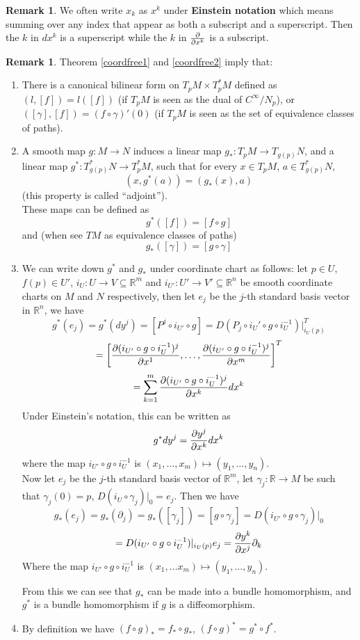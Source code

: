 \documentclass{article}
\theoremstyle{definition}
\newtheorem{rmk}[thm]{Remark}
\begin{document}
\begin{rmk}
    We often write $x_k$ as $x^k$ under {\bf Einstein notation} which means summing over any index that appear as both a subscript and a superscript. Then the $k$ in $dx^k$ is a superscript while the $k$ in $\partial\over \partial x^k$ is a subscript. 
\end{rmk}

\begin{rmk}
Theorem \ref{coordfree1} and \ref{coordfree2} imply that:

\begin{enumerate}
\item There is a canonical bilinear form on $T_pM\times T^*_pM$ defined as $(l, [f])=l([f])$ (if $T_pM$ is seen as the dual of $C^\infty/N_p$), or $([\gamma], [f])=(f\circ \gamma)'(0)$ (if $T_pM$ is seen as the set of equivalence classes of paths).
\item A smooth map $g: M\rightarrow N$ induces a linear map $g_*: T_pM\rightarrow T_{g(p)}N$, and a linear map $g^*: T^*_{g(p)}N\rightarrow T^*_pM$, such that for every $x\in T_pM$, $a\in T^*_{g(p)}N$, 
\[(x, g^*(a))=(g_*(x), a)\]
(this property is called ``adjoint'').\\
    
These maps can be defined as
\[g^*([f])=[f\circ g]\]
and (when see $TM$ as equivalence classes of paths)
\[g_*([\gamma])=[g\circ\gamma]\]
\item We can write down $g^*$ and $g_*$ under coordinate chart as follows: let $p\in U$, $f(p)\in U'$, $i_U: U\rightarrow V\subseteq\mathbb{R}^m$ and $i_{U'}: U'\rightarrow V'\subseteq \mathbb{R}^n$ be smooth coordinate charts on $M$ and $N$ respectively, then let $e_j$ be the $j$-th standard basis vector in $\mathbb{R}^n$, we have
\[g^*(e_j)=g^*(dy^j)=[P^j\circ i_{U'}\circ g]=
D(P_j\circ i_U'\circ g\circ i_U^{-1})|_{i_U(p)}^T\]
\[=\left[{\partial(i_{U'}\circ g\circ i_U^{-1})^j\over \partial x^1}, \dots, {\partial(i_{U'}\circ g\circ i_U^{-1})^j\over \partial x^m}\right]^T\]
\[=\sum_{k=1}^m {\partial(i_{U'}\circ g\circ i_U^{-1})^j\over \partial x^k} dx^k\]
Under Einstein's notation, this can be written as
\[g^*dy^j={\partial y^j\over \partial x^k}dx^k\]
where the map $i_{U'}\circ g\circ i_{U}^{-1}$ is $(x_1, \dots, x_m)\mapsto (y_1, \dots, y_n)$.\\

Now let $e_j$ be the $j$-th standard basis vector of $\mathbb{R}^m$, let $\gamma_j: \mathbb{R}\rightarrow M$ be such that $\gamma_j(0)=p$, $D(i_U\circ\gamma_j)|_0=e_j$. Then we have
\[g_*(e_j)=g_*(\partial_j)=g_*([\gamma_j])=[g\circ \gamma_j]=D(i_{U'}\circ g\circ \gamma_j)|_0\]
\[=D(i_{U'}\circ g\circ i_U^{-1})|_{i_U(p)}e_j={\partial y^k\over \partial x^j}\partial_k\]
Where the map $i_{U'}\circ g\circ i_U^{-1}$ is $(x_1, \dots x_m)\mapsto (y_1, \dots, y_n)$.

From this we can see that $g_*$ can be made into a bundle homomorphism, and $g^*$ is a bundle homomorphism if $g$ is a diffeomorphism.
\item By definition we have $(f\circ g)_*=f_*\circ g_*$, $(f\circ g)^*=g^*\circ f^*$.
\end{enumerate}
\end{rmk}
\end{document}
